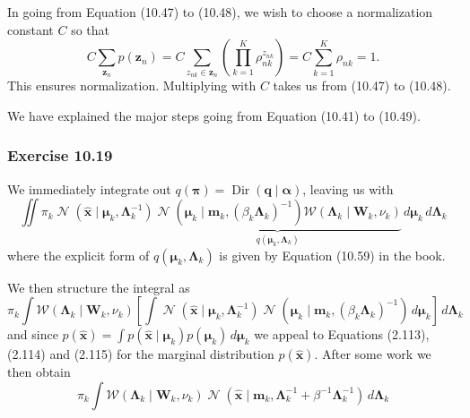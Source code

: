 \documentclass[12pt, a4paper]{article}
\newcommand{\vect}[1]{\bm{#1}}
\DeclareMathOperator{\N}{\mathcal{N}}
\begin{document}
In going from Equation (10.47) to (10.48), we wish to choose a normalization constant $C$ so that
\begin{equation*}
	C \sum_{ \vect{z}_n } p (\vect{z}_n) = 
	C \sum_{z_{nk} \in \vect{z}_n} 
	\left( \prod_{k=1}^{K} \rho_{nk}^{z_{nk}} \right)
	=C \sum_{k=1}^{K} \rho_{nk} 
	= 1.
\end{equation*}
This ensures normalization.
Multiplying with $C$ takes us from (10.47) to (10.48).

We have explained the major steps going from Equation (10.41) to (10.49).

\subsubsection*{Exercise 10.19}

We immediately integrate out $q(\vect{\pi}) = \operatorname{Dir}(\vect{q} \mid \vect{\alpha})$, leaving us with
\begin{equation*}
	\iint \pi_k
	\N \left( \widehat{\vect{x}} \mid \vect{\mu}_k , \vect{\Lambda}_k^{-1} \right)
	\underbrace{\N \left( \vect{\mu}_k \mid \vect{m}_k , (\beta_k \vect{\Lambda}_k )^{-1} \right)
		\mathcal{W}
		\left( \vect{\Lambda}_k \mid \vect{W}_k, \nu_k \right)}_{q(\vect{\mu}_k,\vect{\Lambda}_k )}
	\, d \vect{\mu}_k
	\, d \vect{\Lambda}_k
\end{equation*}
where the explicit form of $q(\vect{\mu}_k,\vect{\Lambda}_k )$ is given by Equation (10.59) in the book.

We then structure the integral as
\begin{equation*}
	\pi_k \int 
	\mathcal{W}
	\left( \vect{\Lambda}_k \mid \vect{W}_k, \nu_k \right)
	\left[
	\int
		\N \left( \widehat{\vect{x}} \mid \vect{\mu}_k , \vect{\Lambda}_k^{-1} \right)
		\N \left( \vect{\mu}_k \mid \vect{m}_k , (\beta_k \vect{\Lambda}_k )^{-1} \right)
	\, d \vect{\mu}_k
	\right]
	\, d \vect{\Lambda}_k
\end{equation*}
and since $p(\widehat{\vect{x}}) = 
\int p(\widehat{\vect{x}} \mid \vect{\mu}_k)
 p(\vect{\mu}_k) \, d \vect{\mu}_k$ we appeal to Equations (2.113), (2.114) and (2.115) for the marginal distribution $p(\widehat{\vect{x}})$.
After some work we then obtain 
\begin{equation}
\label{eqn:ch10_prob19}
\pi_k \int 
\mathcal{W}
\left( \vect{\Lambda}_k \mid \vect{W}_k, \nu_k \right)
\N \left( \widehat{\vect{x}} \mid \vect{m}_k , 
\vect{\Lambda}_k^{-1} + \beta^{-1} \vect{\Lambda}_k^{-1} \right)
\, d \vect{\Lambda}_k
\end{equation}
\end{document}
